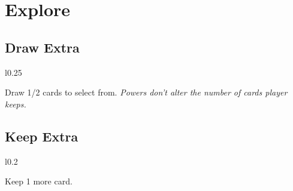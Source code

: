 \documentclass[letterpaper,landscape,twocolumn,8pt]{extarticle}
\begin{document}
\section{Explore}%

\begin{minipage}[t]{\calc{1/3}\columnwidth}
\subsection*{Draw Extra}

\setlength{\intextsep}{0pt}%

\begin{wrapfigure}{l}{0.25\columnwidth}
    
    \smallbreak{}
    
\end{wrapfigure}

Draw 1/2 cards to select from.
\smallbreak{}
\textit{Powers don't alter the number of cards player keeps.}

\end{minipage}
\begin{minipage}[t]{0.3\columnwidth}
\subsection*{Keep Extra}

\setlength{\intextsep}{0pt}%

\begin{wrapfigure}{l}{0.2\columnwidth}
    
\end{wrapfigure}

Keep 1 more card.

\end{minipage}
\end{document}

